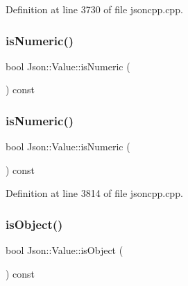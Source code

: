 Definition at line 3730 of file jsoncpp.\+cpp.

\hypertarget{class_json_1_1_value_af961a000cd203c895e44c195ab39b866}{}\label{class_json_1_1_value_af961a000cd203c895e44c195ab39b866} 
\subsubsection{\texorpdfstring{is\+Numeric()}{isNumeric()}\hspace{0.1cm}{\footnotesize\ttfamily [1/2]}}
{\footnotesize\ttfamily bool Json\+::\+Value\+::is\+Numeric (\begin{DoxyParamCaption}{ }\end{DoxyParamCaption}) const}

\hypertarget{class_json_1_1_value_af961a000cd203c895e44c195ab39b866}{}\label{class_json_1_1_value_af961a000cd203c895e44c195ab39b866} 
\subsubsection{\texorpdfstring{is\+Numeric()}{isNumeric()}\hspace{0.1cm}{\footnotesize\ttfamily [2/2]}}
{\footnotesize\ttfamily bool Json\+::\+Value\+::is\+Numeric (\begin{DoxyParamCaption}{ }\end{DoxyParamCaption}) const}



Definition at line 3814 of file jsoncpp.\+cpp.

\hypertarget{class_json_1_1_value_a8cf96c0f2a552051fcfc78ffee60e037}{}\label{class_json_1_1_value_a8cf96c0f2a552051fcfc78ffee60e037} 
\subsubsection{\texorpdfstring{is\+Object()}{isObject()}\hspace{0.1cm}{\footnotesize\ttfamily [1/2]}}
{\footnotesize\ttfamily bool Json\+::\+Value\+::is\+Object (\begin{DoxyParamCaption}{ }\end{DoxyParamCaption}) const}

